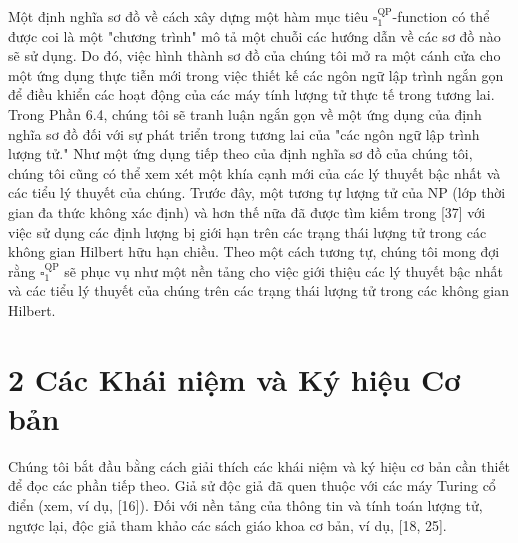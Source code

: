 \documentclass[10pt]{article}
\begin{document}
Một định nghĩa sơ đồ về cách xây dựng một hàm mục tiêu $\square_{1}^{\mathrm{QP}}$-function có thể được coi là một "chương trình" mô tả một chuỗi các hướng dẫn về các sơ đồ nào sẽ sử dụng. Do đó, việc hình thành sơ đồ của chúng tôi mở ra một cánh cửa cho một ứng dụng thực tiễn mới trong việc thiết kế các ngôn ngữ lập trình ngắn gọn để điều khiển các hoạt động của các máy tính lượng tử thực tế trong tương lai. Trong Phần 6.4, chúng tôi sẽ tranh luận ngắn gọn về một ứng dụng của định nghĩa sơ đồ đối với sự phát triển trong tương lai của "các ngôn ngữ lập trình lượng tử." Như một ứng dụng tiếp theo của định nghĩa sơ đồ của chúng tôi, chúng tôi cũng có thể xem xét một khía cạnh mới của các lý thuyết bậc nhất và các tiểu lý thuyết của chúng. Trước đây, một tương tự lượng tử của NP (lớp thời gian đa thức không xác định) và hơn thế nữa đã được tìm kiếm trong [37] với việc sử dụng các định lượng bị giới hạn trên các trạng thái lượng tử trong các không gian Hilbert hữu hạn chiều. Theo một cách tương tự, chúng tôi mong đợi rằng $\square_{1}^{\mathrm{QP}}$ sẽ phục vụ như một nền tảng cho việc giới thiệu các lý thuyết bậc nhất và các tiểu lý thuyết của chúng trên các trạng thái lượng tử trong các không gian Hilbert.

\section*{2 Các Khái niệm và Ký hiệu Cơ bản}
Chúng tôi bắt đầu bằng cách giải thích các khái niệm và ký hiệu cơ bản cần thiết để đọc các phần tiếp theo. Giả sử độc giả đã quen thuộc với các máy Turing cổ điển (xem, ví dụ, [16]). Đối với nền tảng của thông tin và tính toán lượng tử, ngược lại, độc giả tham khảo các sách giáo khoa cơ bản, ví dụ, [18, 25].
\end{document}
